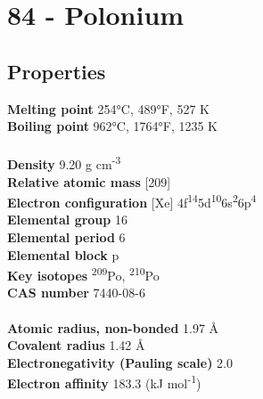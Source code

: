 \section{84 - Polonium}
\label{sec:elem-polonium}
\subsection{Properties}
\textbf{Melting point} 254°C, 489°F, 527 K\\
\textbf{Boiling point} 962°C, 1764°F, 1235 K\\
\\
\textbf{Density} 9.20 g cm\textsuperscript{-3}\\
\textbf{Relative atomic mass} [209]\\
\textbf{Electron configuration} [Xe] 4f\textsuperscript{14}5d\textsuperscript{10}6s\textsuperscript{2}6p\textsuperscript{4}\\
\textbf{Elemental group} 16\\
\textbf{Elemental period} 6\\
\textbf{Elemental block} p\\
\textbf{Key isotopes} \textsuperscript{209}Po, \textsuperscript{210}Po\\
\textbf{CAS number} 7440-08-6\\
\\
\textbf{Atomic radius, non-bonded} 1.97 Å\\
\textbf{Covalent radius} 1.42 Å\\
\textbf{Electronegativity (Pauling scale)} 2.0\\
\textbf{Electron affinity} 183.3 (kJ mol\textsuperscript{-1})\\